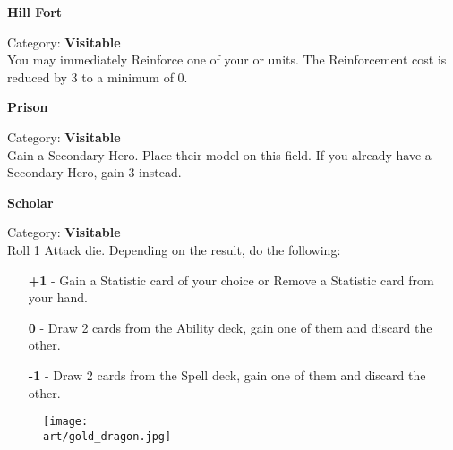 \begin{multicols}{2}
\medskip

\begin{minipage}{\linewidth}
  \begin{center}
    \textbf{Hill Fort}\medskip
  \end{center}
  \small{Category: \textbf{Visitable}\\
    You may immediately Reinforce one of your  or  units.
    The Reinforcement cost is reduced by 3  to a minimum of 0.}
\end{minipage}

\medskip

\begin{minipage}{\linewidth}
  \begin{center}
    \textbf{Prison}\medskip
  \end{center}
  \small{Category: \textbf{Visitable}\\
    Gain a Secondary Hero.
    Place their model on this field.
    If you already have a Secondary Hero, gain 3  instead.}
\end{minipage}

\medskip

\begin{minipage}{\linewidth}
  \begin{center}
    \textbf{Scholar}\par\medskip
  \end{center}
  \small{Category: \textbf{Visitable}\\
    Roll 1 Attack die.
    Depending on the result, do the following:
    \begin{itemize}
      \setlength\itemsep{-0.2em}
      \item[ \textbf{+1}] - Gain a Statistic card of your choice or Remove a Statistic card from your hand.
      \item[\textbf{0}] - Draw 2 cards from the Ability deck, gain one of them and discard the other.
      \item[\textbf{-1}] - Draw 2 cards from the Spell deck, gain one of them and discard the other.
      \end{itemize}
     }
\end{minipage}

\end{multicols}

\vspace*{\fill}

\begin{figure*}[!hb]
  \centering
  \texttt{[image: \\art/gold\_dragon.jpg]}
\end{figure*}
